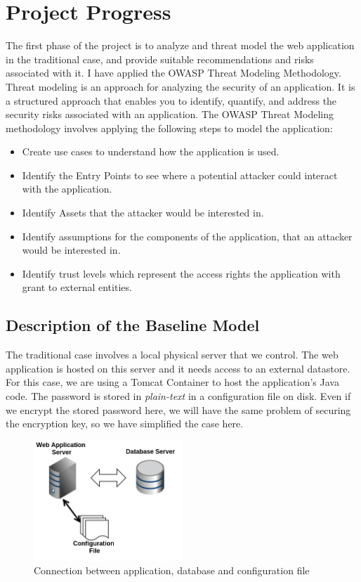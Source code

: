 \documentclass[11pt, a4paper, notitlepage]{article}
\begin{document}
\section{Project Progress}
The first phase of the project is to analyze and threat model the web application in the traditional case, and provide suitable recommendations and risks associated with it. I have applied the OWASP Threat Modeling Methodology. \cite{threat-modelling-owasp}\\

Threat modeling is an approach for analyzing the security of an application. It is a structured approach that enables you to identify, quantify, and address the security risks associated with an application. The OWASP Threat Modeling methodology involves applying the following steps to model the application: 

\begin{itemize}
  \item Create use cases to understand how the application is used.
  \item Identify the Entry Points to see where a potential attacker could interact with the application.
  \item Identify Assets that the attacker would be interested in.
  \item Identify assumptions for the components of the application, that an attacker would be interested in.
  \item Identify trust levels which represent the access rights the application with grant to external entities. 
\end{itemize}

\subsection*{Description of the Baseline Model}
The traditional case involves a local physical server that we control. The web application is hosted on this server and it needs access to an external datastore. For this case, we are using a Tomcat Container to host the application's Java code. The password is stored in \emph{plain-text} in a configuration file on disk. Even if we encrypt the stored password here, we will have the same problem of securing the encryption key, so we have simplified the case here.\\

\begin{figure}[h]
    \centering
    \includegraphics[width=0.5\textwidth]{config}
    \caption{Connection between application, database and configuration file}
\end{figure}
\end{document}
